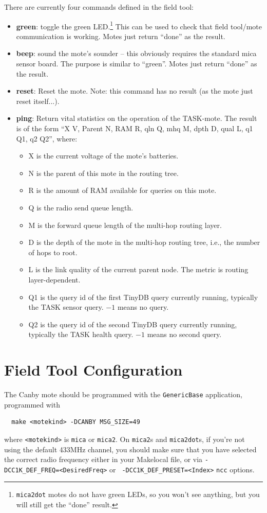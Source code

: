 \documentclass{article}
\begin{document}
There are currently four commands defined in the field tool:
\begin{itemize}
\item {\bf green}: toggle the green LED.\footnote{{\tt mica2dot} motes
do not have green LEDs, so you won't see anything, but you will still
get the ``done'' result.}
This can be used to check that
field tool/mote communication is working. Motes just return ``done'' as the
result.
\item {\bf beep}: sound the mote's sounder -- this obviously requires the
standard mica sensor board. The purpose is similar to
``green''. Motes just return ``done'' as the result.
\item {\bf reset}: Reset the mote. Note: this command has no result (as the
mote just reset itself...).
\item {\bf ping}: Return vital statistics on the operation of the TASK-mote.
The result is of the form ``X V, Parent N, RAM R, qln Q, mhq M, dpth D, qual L, q1 Q1, q2 Q2'', where:
\begin{itemize}
\item X is the current voltage of the mote's batteries.
\item N is the parent of this mote in the routing tree.
\item R is the amount of RAM available for queries on this mote.
\item Q is the radio send queue length.
\item M is the forward queue length of the multi-hop routing layer.
\item D is the depth of the mote in the multi-hop routing tree, i.e., the number
of hops to root.
\item L is the link quality of the current parent node.  The metric is routing layer-dependent.
\item Q1 is the query id of the first TinyDB query currently running, typically the TASK sensor query.  $-1$ means no query.
\item Q2 is the query id of the second TinyDB query currently running,
typically the TASK health query.  $-1$ means no second query.
\end{itemize}
\end{itemize}

\section{Field Tool Configuration}
\label{sec:config}

The Canby mote should be programmed with the {\tt GenericBase} application,
programmed with
\begin{verbatim}
  make <motekind> -DCANBY MSG_SIZE=49
\end{verbatim}
where {\tt <motekind>} is {\tt mica} or {\tt mica2}. On {\tt mica2}s and
{\tt mica2dot}s, if you're not using the default 433MHz channel, you should
make sure that you have selected the correct radio frequency either in
your Makelocal file, or via {\tt -DCC1K\_DEF\_FREQ=<DesiredFreq>} or {\tt
-DCC1K\_DEF\_PRESET=<Index>} {\tt ncc} options.
\end{document}
